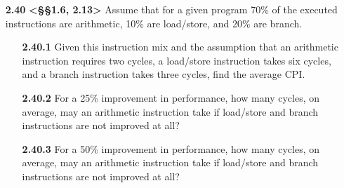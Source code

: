 \documentclass[11pt]{article}
\begin{document}
\begin{enumerate}
    \item[\textbf{2.40}] \textbf{<§§1.6, 2.13>} Assume that for a given program 70\% of the executed instructions are arithmetic, 10\% are load/store, and 20\% are branch.
    
    \begin{enumerate}
        \item[\textbf{2.40.1}] Given this instruction mix and the assumption that an 
        arithmetic instruction requires two cycles, a load/store instruction takes six cycles, 
        and a branch instruction takes three cycles, find the average CPI.
        
        \item[\textbf{2.40.2}] For a 25\% improvement in performance, how many 
        cycles, on average, may an arithmetic instruction take if load/store and branch 
        instructions are not improved at all?
        
        \item[\textbf{2.40.3}] For a 50\% improvement in performance, how many 
        cycles, on average, may an arithmetic instruction take if load/store and branch 
        instructions are not improved at all?
    \end{enumerate}

\end{enumerate}
\end{document}
